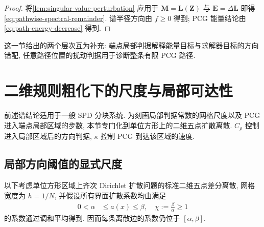 \documentclass{ctexart}
\newcommand{\q}{\quad}
\renewcommand{\ge}{\geqslant}
\renewcommand{\le}{\leqslant}
\begin{document}
\begin{proof}
将\cref{lem:singular-value-perturbation} 应用于
$\bm M=\bm L(\bm Z)$ 与 $\bm E=\Delta\bm L$ 即得\cref{eq:pathwise-spectral-remainder}. 谱半径方向由 $f\ge0$ 得到; PCG 能量结论由\cref{eq:path-energy-decrease} 得到.
\end{proof}


这一节给出的两个层次互为补充: 端点局部判据解释能量目标与求解器目标的方向错配, 任意路径位置的扰动判据用于诊断整条有限 PCG 路径.

\section{二维规则粗化下的尺度与局部可达性}
\label{sec:scaling-reachability}

前述谱结论适用于一般 SPD 分块系统. 为刻画局部判据常数的网格尺度以及 PCG 进入端点局部区域的步数, 本节专门化到单位方形上的二维五点扩散离散. $C_\rho$ 控制进入局部区域后的方向判据, $\kappa$ 控制 PCG 到达该区域的速度.

\subsection{局部方向阈值的显式尺度}
\label{subsec:criterion-scaling}

以下考虑单位方形区域上齐次 Dirichlet 扩散问题的标准二维五点差分离散, 网格宽度为 $h=1/N$, 并假设所有界面扩散系数均由满足
\begin{align}
    0<\alpha&\le a(x)\le\beta,\q
    \chi:=\frac\beta\alpha\ge1
    \label{eq:coefficient-bounds-and-contrast}
\end{align}
的系数通过调和平均得到. 因而每条离散边的系数仍位于 $[\alpha,\beta]$.
\end{document}
